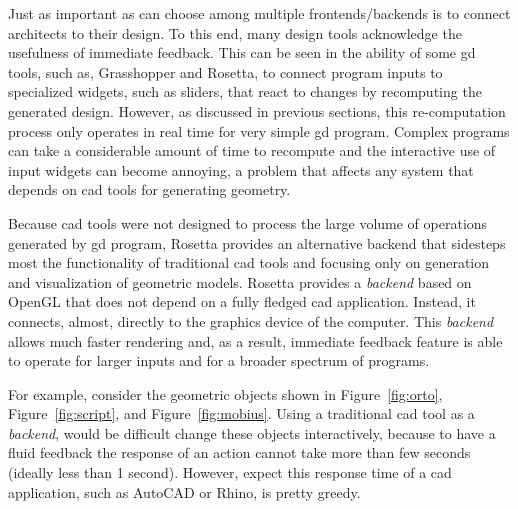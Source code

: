 Just as important as can choose among multiple frontends/backends is to connect architects to their design. To this end, many design tools acknowledge the usefulness of immediate feedback. This can be seen in the ability of some \gls{gd} tools, such as, Grasshopper and Rosetta, to connect program inputs to specialized widgets, such as sliders, that react to changes by recomputing the generated design. However, as discussed in previous sections, this re-computation process only operates in real time for very simple \gls{gd} program. Complex programs can take a considerable amount of time to recompute and the interactive use of input widgets can become annoying, a problem that affects any system that depends on \gls{cad} tools for generating geometry.

Because \gls{cad} tools were not designed to process the large volume of operations generated by \gls{gd} program, Rosetta provides an alternative backend that sidesteps most the functionality of traditional \gls{cad} tools and focusing only on generation and visualization of geometric models. Rosetta provides a \textit{backend} based on OpenGL that does not depend on a fully fledged \gls{cad} application. Instead, it connects, almost, directly to the graphics device of the computer. This \textit{backend} allows much faster rendering and, as a result, immediate feedback feature is able to operate for larger inputs and for a broader spectrum of programs. 

For example, consider the geometric objects shown in Figure~\ref{fig:orto}, Figure~\ref{fig:script}, and Figure~\ref{fig:mobius}. Using a traditional \gls{cad} tool as a \textit{backend}, would be difficult change these objects interactively, because to have a fluid  feedback the response of an action cannot take more than few seconds (ideally less than 1 second). However, expect this response time of a \gls{cad} application, such as AutoCAD or Rhino, is pretty greedy. 

